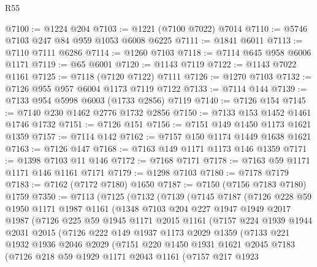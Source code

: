 \begin{lexlean}{R55}
\begin{coremodule}
@7100 := @1224 @204
@7103 := @1221 (@7100 @7022) @7014
@7110 := @5746 @7103 @247 @84 @959 @1053 @6008 @6225
@7111 := @1841 @6011
@7113 := @7110 @7111 @6286
@7114 := @1260 @7103
@7118 := @7114 @645 @958 @6006 @1171
@7119 := @65 @6001
@7120 := @1143 @7119
@7122 := @1143 @7022 @1161
@7125 := @7118 (@7120 @7122) @7111
@7126 := @1270 @7103
@7132 := @7126 @955 @957 @6004 @1173 @7119 @7122
@7133 := @7114 @144
@7139 := @7133 @954 @5998 @6003 (@1733 @2856) @7119
@7140 := @7126 @154
@7145 := @7140 @230 @1462 @2776 @1732 @2856
@7150 := @7133 @153 @1452 @1461 @1746 @1732
@7151 := @7126 @151
@7156 := @7151 @149 @1450 @1173 @1621 @1359
@7157 := @7114 @142
@7162 := @7157 @150 @1174 @1449 @1638 @1621
@7163 := @7126 @147
@7168 := @7163 @149 @1171 @1173 @146 @1359
@7171 := @1398 @7103 @11 @146
@7172 := @7168 @7171
@7178 := @7163 @59 @1171 @1171 @146 @1161 @7171
@7179 := @1298 @7103
@7180 := @7178 @7179
@7183 := @7162 (@7172 @7180) @1650
@7187 := @7150 (@7156 @7183 @7180) @1759
@7350 := @7113
    (@7125
      (@7132
        (@7139
          (@7145
            @7187
            (@7126
              @228
              @59
              @1950
              @1171
              @1987
              @1161
              (@1348
                @7103
                @204
                @227
                @1947
                @1949
                @2017
                @1987
                (@7126
                  @225
                  @59
                  @1945
                  @1171
                  @2015
                  @1161
                  (@7157
                    @224
                    @1939
                    @1944
                    @2031
                    @2015
                    (@7126
                      @222
                      @149
                      @1937
                      @1173
                      @2029
                      @1359
                      (@7133
                        @221
                        @1932
                        @1936
                        @2046
                        @2029
                        (@7151
                          @220
                          @1450
                          @1931
                          @1621
                          @2045
                          @7183
                          (@7126
                            @218
                            @59
                            @1929
                            @1171
                            @2043
                            @1161
                            (@7157
                              @217
                              @1923

\end{coremodule}
\end{lexlean}
